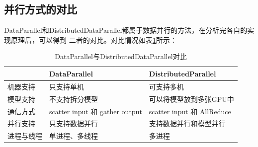 \subsection{并行方式的对比}

DataParallel和DistributedDataParallel都属于数据并行的方法，在分析完各自的实现原理后，可以得到
二者的对比。对比情况如表\ref{tab:com}所示：

\begin{table}[h]
    \centering
    \caption{DataParallel与DistributedDataParallel对比}
    \begin{tabular}{>{\centering\arraybackslash}p{5em}>{\centering\arraybackslash}p{12em}>{\centering\arraybackslash}p{13em}}
    \toprule
    { } & DataParallel & DistributedParallel \\ \midrule
    机器支持 & 只支持单机 & 可支持多机 \\
    模型支持 & 不支持拆分模型 & 可以将模型放到多张GPU中 \\
    通信方式 & scatter input 和 gather output & scatter input 和 AllReduce \\
    并行支持 & 只支持数据并行 & 支持数据并行和模型并行 \\
    进程与线程 & 单进程、多线程 & 多进程 \\
    \bottomrule
    \end{tabular}
    \label{tab:com}
\end{table}